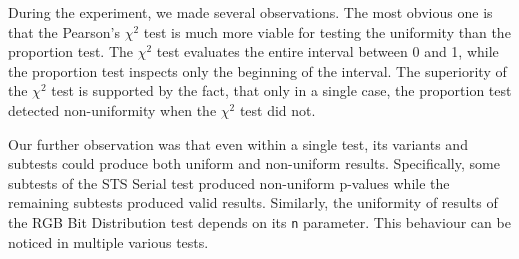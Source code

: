 \documentclass[
  digital,  	%
  color,		%
  oneside,   	%
  12pt,
  nocover,
  notable,
  nolof,
  nolot,
]{fithesis3}
\theoremstyle{definition}
\theoremstyle{remark}
\begin{document}
During the experiment, we made several observations. The most obvious one is that the Pearson's $\chi^2$ test is much more viable for testing the uniformity than the proportion test. The $\chi^2$ test evaluates the entire interval between 0 and 1, while the proportion test inspects only the beginning of the interval. The superiority of the $\chi^2$ test is supported by the fact, that only in a single case, the proportion test detected non-uniformity when the $\chi^2$ test did not. 

Our further observation was that even within a single test, its variants and subtests could produce both uniform and non-uniform results. Specifically, some subtests of the STS Serial test produced non-uniform p-values while the remaining subtests produced valid results. Similarly, the uniformity of results of the RGB Bit Distribution test depends on its \texttt{n} parameter. This behaviour can be noticed in multiple various tests.
\end{document}
